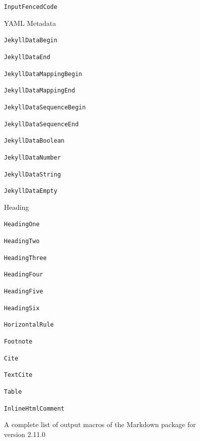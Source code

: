 \documentclass[
  digital,     %
  oneside,     %
  nosansbold,  %
  nocolorbold, %
  lof,         %
  nolot,       %
]{fithesis4}
\begin{document}
\begin{figure}
\begin{multicols}{2}
\begin{compactenum}
\begin{compactenum}
        \item \texttt{InputFencedCode}
      \end{compactenum}
      \item YAML Metadata
      \begin{compactenum}  %
        \item \texttt{JekyllDataBegin}
        \item \texttt{JekyllDataEnd}
        \item \texttt{JekyllDataMappingBegin}
        \item \texttt{JekyllDataMappingEnd}
        \item \texttt{JekyllDataSequenceBegin}
        \item \texttt{JekyllDataSequenceEnd}
        \item \texttt{JekyllDataBoolean}
        \item \texttt{JekyllDataNumber}
        \item \texttt{JekyllDataString}
        \item \texttt{JekyllDataEmpty}
      \end{compactenum}
      \item Heading
      \begin{compactenum}
        \item \texttt{HeadingOne}
        \item \texttt{HeadingTwo}
        \item \texttt{HeadingThree}
        \item \texttt{HeadingFour}
        \item \texttt{HeadingFive}
        \item \texttt{HeadingSix}
      \end{compactenum}
      \item \texttt{HorizontalRule}
      \item \texttt{Footnote}
      \item \texttt{Cite}
      \item \texttt{TextCite}
      \item \texttt{Table}
      \item \texttt{InlineHtmlComment}
    \end{compactenum}
  \end{multicols}
  \vspace*{-1em}
  \caption{A complete list of output macros of the Markdown package for version 2.11.0}
  \label{fig:markdown-renderers}
\end{figure}
\end{document}

